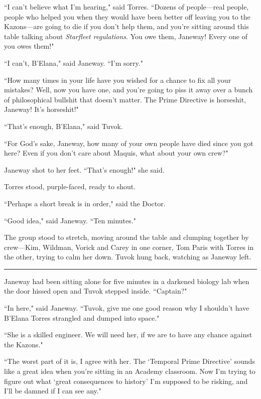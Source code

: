 \documentclass[twoside,letterpaper,12pt]{memoir}
\begin{document}
``I can't believe what I'm hearing," said Torres. ``Dozens of people---real people, people who helped you when they would have been better off leaving you to the Kazons---are going to die if you don't help them, and you're sitting around this table talking about \textit{Starfleet regulations}. You owe them, Janeway! Every one of you owes them!" 

``I can't, B'Elana," said Janeway. ``I'm sorry." 

``How many times in your life have you wished for a chance to fix all your mistakes? Well, now you have one, and you're going to piss it away over a bunch of philosophical bullshit that doesn't matter. The Prime Directive is horseshit, Janeway! It’s horseshit!" 

``That's enough, B'Elana," said Tuvok. 

``For God's sake, Janeway, how many of your own people have died since you got here? Even if you don't care about Maquis, what about your own crew?" 

Janeway shot to her feet. ``That's enough!" she said. 

Torres stood, purple-faced, ready to shout. 

``Perhaps a short break is in order," said the Doctor. 

``Good idea," said Janeway. ``Ten minutes." 

The group stood to stretch, moving around the table and clumping together by crew---Kim, Wildman, Vorick and Carey in one corner, Tom Paris with Torres in the other, trying to calm her down. Tuvok hung back, watching as Janeway left. 

\begin{center}\rule{3cm}{0.4 pt}\end{center} 

Janeway had been sitting alone for five minutes in a darkened biology lab when the door hissed open and Tuvok stepped inside. ``Captain?" 

``In here," said Janeway. ``Tuvok, give me one good reason why I shouldn't have B'Elana Torres strangled and dumped into space." 

``She is a skilled engineer. We will need her, if we are to have any chance against the Kazons." 

``The worst part of it is, I agree with her. The `Temporal Prime Directive' sounds like a great idea when you're sitting in an Academy classroom. Now I'm trying to figure out what `great consequences to history' I'm supposed to be risking, and I'll be damned if I can see any." 
\end{document}
